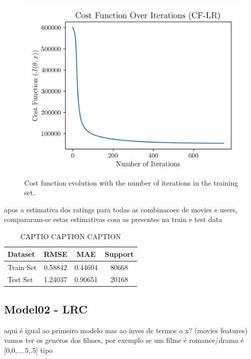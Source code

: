 \documentclass[conference]{IEEEtran}
\begin{document}
\begin{figure}[H]
    \centering
    \includegraphics[width=1\linewidth]{assets/model01_cost_function.png}
    \caption{Cost function evolution with the number of iterations in the training set.}
    \label{fig:model01_cost_function}
\end{figure}

apos a estimativa dos ratings para todas as combinacoes de movies e users, compararam-se estas estimativas com as presentes na train e test data

\begin{table}[H]
\centering
\caption{CAPTIO CAPTION CAPTION}
\label{tab:model01_results}
\begin{tabular}{lccc}
\toprule
\textbf{Dataset} & \textbf{RMSE} & \textbf{MAE} & \textbf{Support} \\
\midrule
Train Set & 0.58842 & 0.44604 & 80668 \\
Test Set & 1.24037 & 0.90651 & 20168 \\
\bottomrule
\end{tabular}
\end{table}

\subsection{Model02 - LRC}

aqui é igual ao primeiro modelo mas ao inves de termos o x? (movies features) vamos ter os generos dos filmes, por exemplo se um filme é romance/drama é [0,0,....5,.5] tipo
\end{document}
